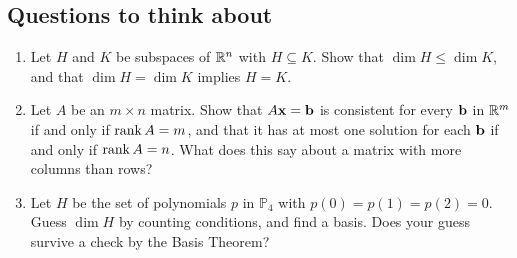 \documentclass[11pt]{article}
\begin{document}
\subsection*{Questions to think about}
\begin{enumerate}
  \item Let $H$ and $K$ be subspaces of $\mathbb{R}^n$ with $H\subseteq K$. Show that $\dim H\le\dim K$, and that $\dim H=\dim K$ implies $H=K$.
  \item Let $A$ be an $m\times n$ matrix. Show that $A\mathbf{x}=\mathbf{b}$ is consistent for every $\mathbf{b}$ in $\mathbb{R}^m$ if and only if $\operatorname{rank} A=m$, and that it has at most one solution for each $\mathbf{b}$ if and only if $\operatorname{rank} A=n$. What does this say about a matrix with more columns than rows?
  \item Let $H$ be the set of polynomials $p$ in $\mathbb{P}_4$ with $p(0)=p(1)=p(2)=0$. Guess $\dim H$ by counting conditions, and find a basis. Does your guess survive a check by the Basis Theorem?
\end{enumerate}
\end{document}
